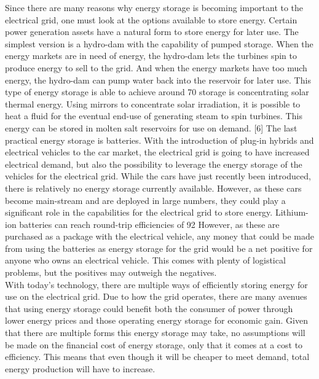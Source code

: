 Since there are many reasons why energy storage is becoming important to the electrical grid,
one must look at the options available to store energy. Certain power generation assets have a natural
form to store energy for later use. The simplest version is a hydro-dam with the capability of pumped
storage. When the energy markets are in need of energy, the hydro-dam lets the turbines spin to
produce energy to sell to the grid. And when the energy markets have too much energy, the hydro-dam
can pump water back into the reservoir for later use. This type of energy storage is able to achieve
around 70%
storage is concentrating solar thermal energy. Using mirrors to concentrate solar irradiation, it is
possible to heat a fluid for the eventual end-use of generating steam to spin turbines. This energy can
be stored in molten salt reservoirs for use on demand. [6] The last practical energy storage is batteries.
With the introduction of plug-in hybrids and electrical vehicles to the car market, the electrical grid is
going to have increased electrical demand, but also the possibility to leverage the energy storage of the
vehicles for the electrical grid. While the cars have just recently been introduced, there is relatively no
energy storage currently available. However, as these cars become main-stream and are deployed in
large numbers, they could play a significant role in the capabilities for the electrical grid to store energy.
Lithium-ion batteries can reach round-trip efficiencies of 92%
However, as these are purchased as a package with the electrical vehicle, any money that could be
made from using the batteries as energy storage for the grid would be a net positive for anyone who
owns an electrical vehicle. This comes with plenty of logistical problems, but the positives may
outweigh the negatives.  \\

With today’s technology, there are multiple ways of efficiently storing energy for use on the
electrical grid. Due to how the grid operates, there are many avenues that using energy storage could
benefit both the consumer of power through lower energy prices and those operating energy storage
for economic gain. Given that there are multiple forms this energy storage may take, no assumptions
will be made on the financial cost of energy storage, only that it comes at a cost to efficiency. This
means that even though it will be cheaper to meet demand, total energy production will have to
increase. \\

